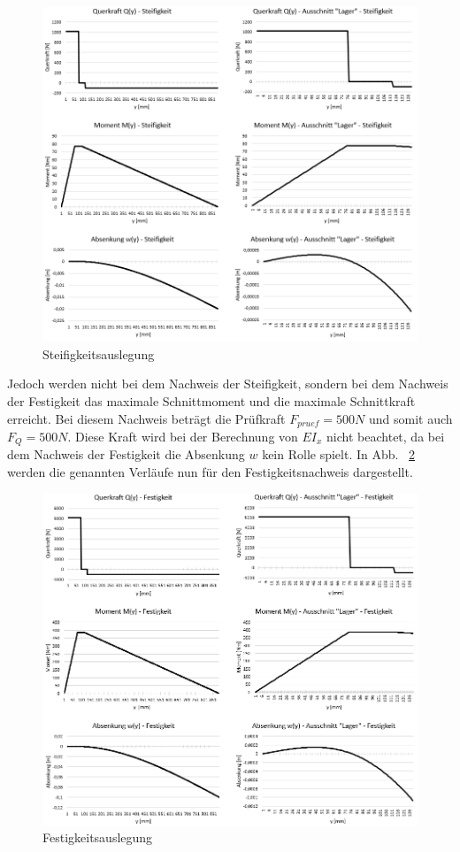 \begin{figure}
	\includegraphics[width=1.0\textwidth]{Bilder/Grafiken Steifigkeit.png}
	\caption{Steifigkeitsauslegung}
	\label{fig:Steifigkeitsauslegung}
\end{figure}

\noindent Jedoch werden nicht bei dem Nachweis der Steifigkeit, sondern bei dem Nachweis der Festigkeit das maximale Schnittmoment und die maximale Schnittkraft erreicht. Bei diesem Nachweis beträgt die Prüfkraft $F_{pruef} = 500N$ und somit auch $F_{Q} = 500N$. Diese Kraft wird bei der Berechnung von $EI_{x}$ nicht beachtet, da bei dem Nachweis der Festigkeit die Absenkung $w$ kein Rolle spielt. In Abb. ~\ref{fig:Festigkeitsauslegung} werden die genannten Verläufe nun für den Festigkeitsnachweis dargestellt.
\begin{figure}
	\includegraphics[width=1.0\textwidth]{Bilder/Grafiken Festigkeit.png}
	\caption{Festigkeitsauslegung}
	\label{fig:Festigkeitsauslegung}
\end{figure}

